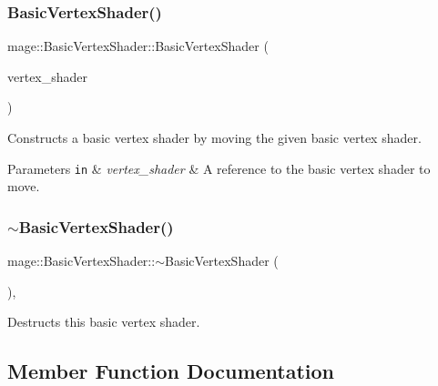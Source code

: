 \subsubsection{\texorpdfstring{Basic\+Vertex\+Shader()}{BasicVertexShader()}\hspace{0.1cm}{\footnotesize\ttfamily [6/6]}}
{\footnotesize\ttfamily mage\+::\+Basic\+Vertex\+Shader\+::\+Basic\+Vertex\+Shader (\begin{DoxyParamCaption}\item[{\hyperlink{classmage_1_1_basic_vertex_shader}{Basic\+Vertex\+Shader} \&\&}]{vertex\+\_\+shader }\end{DoxyParamCaption})\hspace{0.3cm}{\ttfamily [default]}}

Constructs a basic vertex shader by moving the given basic vertex shader.


\begin{DoxyParams}[1]{Parameters}
\mbox{\tt in}  & {\em vertex\+\_\+shader} & A reference to the basic vertex shader to move. \\
\hline
\end{DoxyParams}
\hypertarget{classmage_1_1_basic_vertex_shader_ad155c4135f5517667020ec519a3597c9}{}\label{classmage_1_1_basic_vertex_shader_ad155c4135f5517667020ec519a3597c9} 
\subsubsection{\texorpdfstring{$\sim$\+Basic\+Vertex\+Shader()}{~BasicVertexShader()}}
{\footnotesize\ttfamily mage\+::\+Basic\+Vertex\+Shader\+::$\sim$\+Basic\+Vertex\+Shader (\begin{DoxyParamCaption}{ }\end{DoxyParamCaption})\hspace{0.3cm}{\ttfamily [virtual]}, {\ttfamily [default]}}

Destructs this basic vertex shader. 

\subsection{Member Function Documentation}
\hypertarget{classmage_1_1_basic_vertex_shader_ab3d355e76715b24e21fb37c239d41932}{}\label{classmage_1_1_basic_vertex_shader_ab3d355e76715b24e21fb37c239d41932} 
